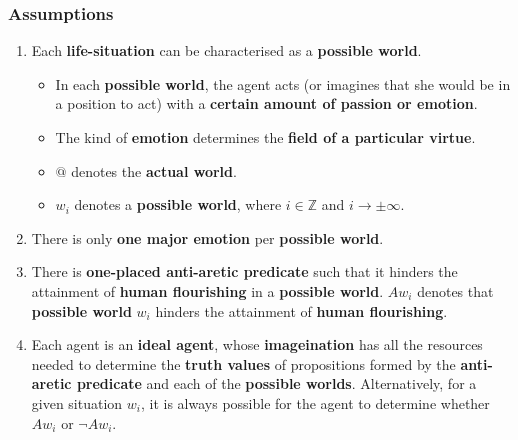 \documentclass[11pt]{article}
\begin{document}
\subsubsection{Assumptions}
\label{sec:orgbb3e218}
\begin{enumerate}
\item Each \textbf{life-situation} can be characterised as a \textbf{possible world}.
\begin{itemize}
\item In each \textbf{possible world}, the agent acts (or imagines that she would be in a position to act) with a \textbf{certain amount of passion or emotion}.
\item The kind of \textbf{emotion} determines the \textbf{field of a particular virtue}.
\item \(@\) denotes the \textbf{actual world}.
\item \(w_i\) denotes a \textbf{possible world}, where \(i \in \mathbb{Z}\) and \(i \rightarrow \pm \infty\).
\end{itemize}
\item There is only \textbf{one major emotion} per \textbf{possible world}.
\item There is \textbf{one-placed anti-aretic predicate} such that it hinders the attainment of \textbf{human flourishing} in a \textbf{possible world}.
\(Aw_i\) denotes that \textbf{possible world} \(w_i\) hinders the attainment of \textbf{human flourishing}.
\item Each agent is an \textbf{ideal agent}, whose \textbf{imageination} has all the resources needed to determine the \textbf{truth values} of propositions formed by the \textbf{anti-aretic predicate} and each of the \textbf{possible worlds}.
Alternatively, for a given situation \(w_i\), it is always possible for the agent to determine whether \(Aw_i\) or \(\neg Aw_i\).
\end{enumerate}

 \newpage
\end{document}

